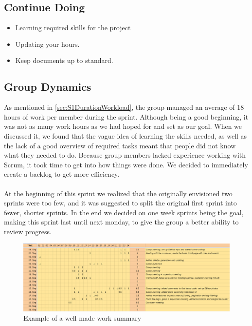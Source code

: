 \subsection{Continue Doing}
\label{subsec:S1RetrospectiveContinue}

\begin{itemize}
  \item Learning required skills for the project
  \item Updating your hours.
  \item Keep documents up to standard.
\end{itemize}

\subsection{Group Dynamics}
\label{subsec:S1RetrospectiveGroupDynamics}
As mentioned in \ref{sec:S1DurationWorkload}, the group managed an average of 18 hours of work per member during the sprint. Although being a good beginning, it was not as many work hours as we had hoped for and set as our goal. When we discussed it, we found that the vague idea of learning the skills needed, as well as the lack of a good overview of required tasks meant that people did not know what they needed to do. Because group members lacked experience working with Scrum,  it took time to get into how things were done. We decided to immediately create a backlog to get more efficiency.

\paragraph{} At the beginning of this sprint we realized that the originally envisioned two sprints were too few, and it was suggested to split the original first sprint into fewer, shorter sprints. In the end we decided on one week sprints being the goal, making this sprint last until next monday, to give the group a better ability to review progress.

\begin{figure}[ht!]
  \includegraphics[width=\linewidth]{./img/WorkSheetExample}
  \caption{Example of a well made work summary}
\end{figure}


